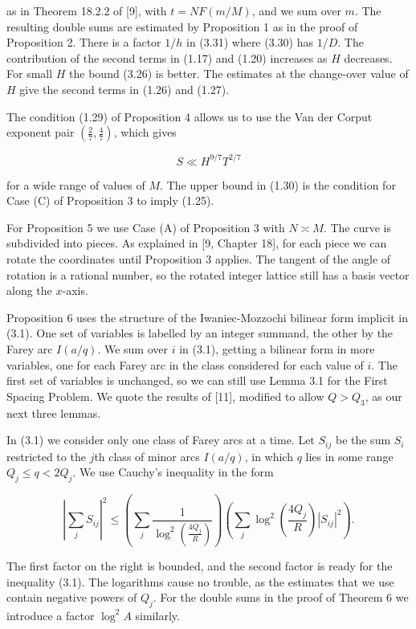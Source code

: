 \documentclass[10pt]{article}
\begin{document}
as in Theorem 18.2.2 of [9], with $t=N F(m / M)$, and we sum over $m$. The resulting double sums are estimated by Proposition 1 as in the proof of Proposition 2. There is a factor $1 / h$ in (3.31) where (3.30) has $1 / D$. The contribution of the second terms in (1.17) and (1.20) increases as $H$ decreases. For small $H$ the bound (3.26) is better. The estimates at the change-over value of $H$ give the second terms in (1.26) and (1.27).

The condition (1.29) of Proposition 4 allows us to use the Van der Corput exponent pair $\left(\frac{2}{7}, \frac{4}{7}\right)$, which gives

$$
S \ll H^{9 / 7} T^{2 / 7}
$$

for a wide range of values of $M$. The upper bound in (1.30) is the condition for Case (C) of Proposition 3 to imply (1.25).

For Proposition 5 we use Case (A) of Proposition 3 with $N \asymp M$. The curve is subdivided into pieces. As explained in [9, Chapter 18], for each piece we can rotate the coordinates until Proposition 3 applies. The tangent of the angle of rotation is a rational number, so the rotated integer lattice still has a basis vector along the $x$-axis.

Proposition 6 uses the structure of the Iwaniec-Mozzochi bilinear form implicit in (3.1). One set of variables is labelled by an integer summand, the other by the Farey arc $I(a / q)$. We sum over $i$ in (3.1), getting a bilinear form in more variables, one for each Farey arc in the class considered for each value of $i$. The first set of variables is unchanged, so we can still use Lemma 3.1 for the First Spacing Problem. We quote the results of [11], modified to allow $Q>Q_{3}$, as our next three lemmas.

In (3.1) we consider only one class of Farey arcs at a time. Let $S_{i j}$ be the sum $S_{i}$ restricted to the $j$th class of minor arcs $I(a / q)$, in which $q$ lies in some range $Q_{j} \leqslant q<2Q_{j}$. We use Cauchy's inequality in the form

$$
\left|\sum_{j} S_{i j}\right|^{2} \leqslant\left(\sum_{j} \frac{1}{\log^{2}\left(\frac{4Q_{j}}{R}\right)}\right)\left(\sum_{j}\log^{2}\left(\frac{4Q_{j}}{R}\right)\left|S_{i j}\right|^{2}\right).
$$

The first factor on the right is bounded, and the second factor is ready for the inequality (3.1). The logarithms cause no trouble, as the estimates that we use contain negative powers of $Q_{j}$. For the double sums in the proof of Theorem 6 we introduce a factor $\log ^{2} A$ similarly.
\end{document}
